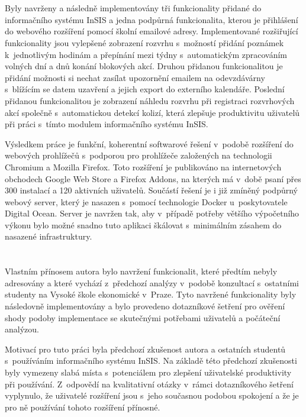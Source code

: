 \section*{\Vysledky}

Byly navrženy a následně implementovány tři funkcionality přidané do informačního systému InSIS a jedna podpůrná funkcionalita, kterou je přihlášení do webového rozšíření pomocí školní emailové adresy.  Implementované rozšiřující funkcionality jsou vylepšené zobrazení rozvrhu s~možností přidání poznámek k~jednotlivým hodinám a přepínání mezi týdny s~automatickým zpracováním volných dní a dnů konání blokových akcí. Druhou přidanou funkcionalitou je přidání možnosti si nechat zasílat upozornění emailem na odevzdávárny s~blížícím se datem uzavření a jejich export do externího kalendáře. Poslední přidanou funkcionalitou je zobrazení náhledu rozvrhu při registraci rozvrhových akcí společně s~automatickou detekcí kolizí, která zlepšuje produktivitu uživatelů při práci s~tímto modulem informačního systému InSIS.

Výsledkem práce je funkční, koherentní softwarové řešení v~podobě rozšíření do webových prohlížečů s~podporou pro prohlížeče založených na technologii Chromium a Mozilla Firefox. Toto rozšíření je publikováno na internetových obchodech Google Web Store a Firefox Addons, na kterých má v~době psaní přes 300 instalací a 120 aktivních uživatelů. Součástí řešení je i již zmíněný podpůrný webový server, který je nasazen s~pomocí technologie Docker u~poskytovatele Digital Ocean. Server je navržen tak, aby v~případě potřeby většího výpočetního výkonu bylo možné snadno tuto aplikaci škálovat s~minimálním zásahem do nasazené infrastruktury.

\section*{\PrinosAutora}

Vlastním přínosem autora bylo navržení funkcionalit, které předtím nebyly adresovány a které vychází z~předchozí analýzy v~podobě konzultací s~ostatními studenty na Vysoké škole ekonomické v~Praze. Tyto navržené funkcionality byly následovně implementovány a bylo provedeno dotazníkové šetření pro ověření shody podoby implementace se skutečnými potřebami uživatelů a počáteční analýzou. 

Motivací pro tuto práci byla předchozí zkušenost autora a ostatních studentů s~používáním informačního systému InSIS. Na základě této předchozí zkušenosti byly vymezeny slabá místa s~potenciálem pro zlepšení uživatelské produktivity při používání. Z~odpovědí na kvalitativní otázky v~rámci dotazníkového šetření vyplynulo, že uživatelé rozšíření jsou s~jeho současnou podobou spokojení a že je pro ně používání tohoto rozšíření přínosné.

